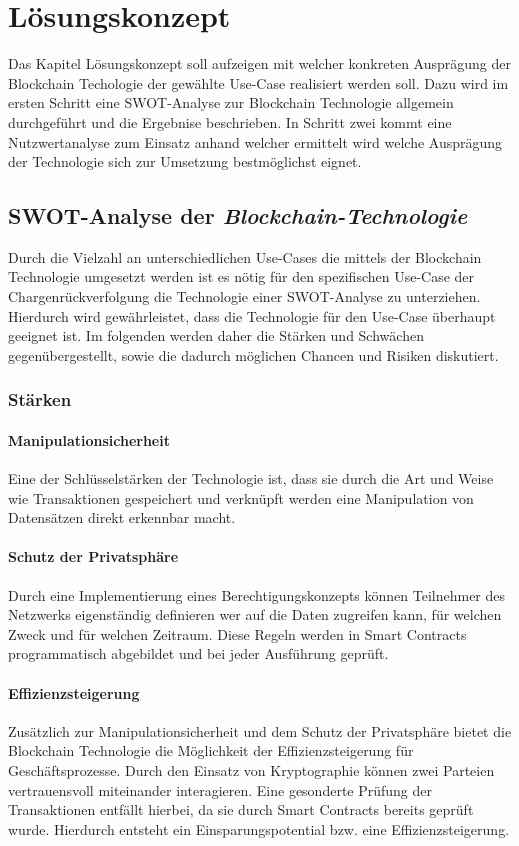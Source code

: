 \section{Lösungskonzept}
Das Kapitel Lösungskonzept soll aufzeigen mit welcher konkreten Ausprägung der Blockchain Techologie der gewählte Use-Case realisiert werden soll. Dazu wird im ersten Schritt eine SWOT-Analyse zur Blockchain Technologie allgemein durchgeführt und die Ergebnise beschrieben. In Schritt zwei kommt eine Nutzwertanalyse zum Einsatz anhand welcher ermittelt wird welche Ausprägung der Technologie sich zur Umsetzung bestmöglichst eignet.

\subsection{SWOT-Analyse der \textit{Blockchain-Technologie}}
Durch die Vielzahl an unterschiedlichen Use-Cases die mittels der Blockchain Technologie umgesetzt werden ist es nötig für den spezifischen Use-Case der Chargenrückverfolgung die Technologie einer SWOT-Analyse zu unterziehen. Hierdurch wird gewährleistet, dass die Technologie für den Use-Case überhaupt geeignet ist. Im folgenden werden daher die Stärken und Schwächen gegenübergestellt, sowie die dadurch möglichen Chancen und Risiken diskutiert.

\subsubsection{Stärken}
\paragraph{Manipulationsicherheit}
Eine der Schlüsselstärken der Technologie ist, dass sie durch die Art und Weise wie Transaktionen gespeichert und verknüpft werden eine Manipulation von Datensätzen direkt erkennbar macht.

\paragraph{Schutz der Privatsphäre}
Durch eine Implementierung eines Berechtigungskonzepts können Teilnehmer des Netzwerks eigenständig definieren wer auf die Daten zugreifen kann, für welchen Zweck und für welchen Zeitraum. Diese Regeln werden in Smart Contracts programmatisch abgebildet und bei jeder Ausführung geprüft.

\paragraph{Effizienzsteigerung}
Zusätzlich zur Manipulationsicherheit und dem Schutz der Privatsphäre bietet die Blockchain Technologie die Möglichkeit der Effizienzsteigerung für Geschäftsprozesse. Durch den Einsatz von Kryptographie können zwei Parteien vertrauensvoll miteinander interagieren. Eine gesonderte Prüfung der Transaktionen entfällt hierbei, da sie durch Smart Contracts bereits geprüft wurde. Hierdurch entsteht ein Einsparungspotential bzw. eine Effizienzsteigerung.

